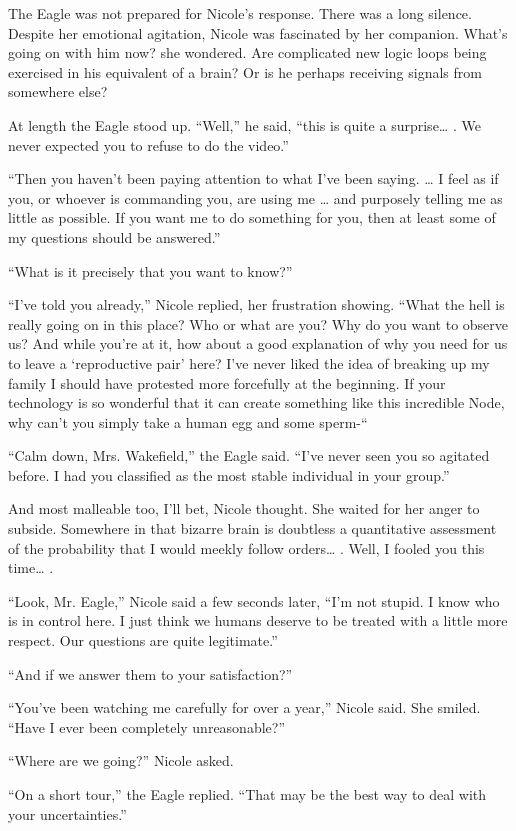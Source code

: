 \documentclass[]{article}
\begin{document}
{The Eagle was not prepared for Nicole’s response.  There was a long silence.  Despite her emotional agitation, Nicole was fascinated by her companion.  What’s going on with him now? she wondered.  Are complicated new logic loops being exercised in his equivalent of a brain? Or is he perhaps receiving signals from somewhere else?

At length the Eagle stood up.  “Well,” he said, “this is quite a surprise… .  We never expected you to refuse to do the video.”

“Then you haven’t been paying attention to what I’ve been saying.  … I feel as if you, or whoever is commanding you, are using me … and purposely telling me as little as possible.  If you want me to do something for you, then at least some of my questions should be answered.”

“What is it precisely that you want to know?”

“I’ve told you already,” Nicole replied, her frustration showing.  “What the hell is really going on in this place? Who or what are you? Why do you want to observe us? And while you’re at it, how about a good explanation of why you need for us to leave a ‘reproductive pair’ here? I’ve never liked the idea of breaking up my family I should have protested more forcefully at the beginning.  If your technology is so wonderful that it can create something like this incredible Node, why can’t you simply take a human egg and some sperm-“

“Calm down, Mrs.  Wakefield,” the Eagle said.  “I’ve never seen you so agitated before.  I had you classified as the most stable individual in your group.”

And most malleable too, I’ll bet, Nicole thought.  She waited for her anger to subside.  Somewhere in that bizarre brain is doubtless a quantitative assessment of the probability that I would meekly follow orders… .  Well, I fooled you this time… .

“Look, Mr.  Eagle,” Nicole said a few seconds later, “I’m not stupid.  I know who is in control here.  I just think we humans deserve to be treated with a little more respect.  Our questions are quite legitimate.”

“And if we answer them to your satisfaction?”

“You’ve been watching me carefully for over a year,” Nicole said.  She smiled.  “Have I ever been completely unreasonable?”

“Where are we going?” Nicole asked.

“On a short tour,” the Eagle replied.  “That may be the best way to deal with your uncertainties.”

}
\end{document}
